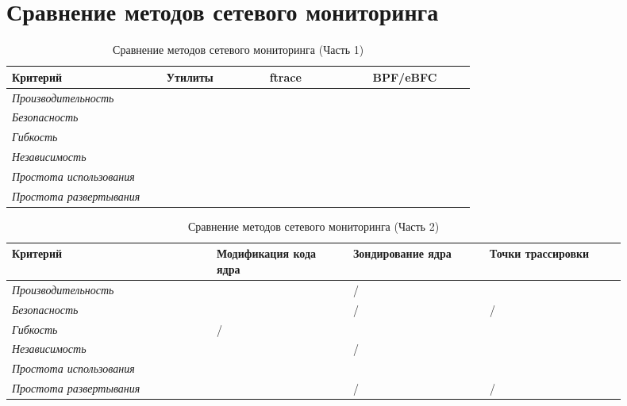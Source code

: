 \clearpage

\section{Сравнение методов сетевого мониторинга}

\begin{table}[h!]
	\begin{center}
		\begin{threeparttable}
			\caption{\label{tab:comparison_1} Сравнение методов сетевого мониторинга (Часть 1)}
			\begin{tabular}{|p{0.3\linewidth}|p{0.2\linewidth}|p{0.2\linewidth}|p{0.2\linewidth}|}
				\hline
				\textbf{Критерий} & \textbf{Утилиты} & \textbf{ftrace} & \textbf{BPF/eBFC} \\ \hline
				\textit{Производительность} & \cmark & \cmark & \cmark \\ \hline
				\textit{Безопасность} & \cmark & \cmark & \cmark \\ \hline
				\textit{Гибкость} & \xmark & \xmark & \xmark \\ \hline
				\textit{Независимость} & \xmark & \cmark & \cmark \\ \hline
				\textit{Простота использования} & \cmark & \xmark & \cmark \\ \hline
				\textit{Простота развертывания} & \cmark & \xmark & \cmark \\ \hline
			\end{tabular}
		\end{threeparttable}
	\end{center}
\end{table}


\begin{table}[h!]
	\begin{center}
		\begin{threeparttable}
			\captionsetup{justification=raggedright,singlelinecheck=off}
			\caption{\label{tab:comparison_2} Сравнение методов сетевого мониторинга (Часть 2)}
			\begin{tabular}{|p{0.3\linewidth}|p{0.2\linewidth}|p{0.2\linewidth}|p{0.2\linewidth}|}
				\hline
				\textbf{Критерий} & \textbf{Модификация кода ядра} & \textbf{Зондирование ядра} & \textbf{Точки трассировки} \\ \hline
				\textit{Производительность} & \xmark & \cmark/\xmark\footnotemark{} & \cmark \\ \hline
				\textit{Безопасность} & \xmark & \cmark/\xmark & \cmark/\xmark \\ \hline
				\textit{Гибкость} & \cmark/\xmark & \cmark & \cmark  \\ \hline
				\textit{Независимость}  & \xmark & \cmark/\xmark & \cmark  \\ \hline
				\textit{Простота использования}  & \xmark & \xmark & \xmark \\ \hline
				\textit{Простота развертывания}  & \xmark & \cmark/\xmark & \cmark/\xmark \\ \hline
			\end{tabular}
		\end{threeparttable}
	\end{center}
\end{table}

